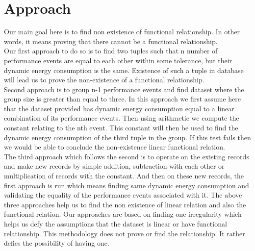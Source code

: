 \section{Approach}
Our main goal here is to find non existence of functional relationship. In other words, it means proving that there cannot be a functional relationship.\\
Our first approach to do so is to find two tuples such that n number of performance events are equal to each other within some tolerance, but their dynamic energy consumption is the same. Existence of such a tuple in database will lead us to prove the non-existence of a functional relationship.\\
Second approach is to group n-1 performance events and find dataset where the group size is greater than equal to three. In this approach we first assume here that the dataset provided has dynamic energy consumption equal to a linear combination of its performance events. Then using arithmetic we compute the constant relating to the nth event. This constant will then be used to find the dynamic energy consumption of the third tuple in the group. If this test fails then we would be able to conclude the non-existence linear functional relation.\\
The third approach which follows the second is to operate on the existing records and make new records by simple addition, subtraction with each other or multiplication of records with the constant. And then on these new records, the first approach is run which means finding same dynamic energy consumption and validating the equality of the performance events associated with it. The above three approaches help us to find the non existence of linear relation and also the functional relation. Our approaches are based on finding one irregularity which helps us defy the assumptions that the dataset is linear or have functional relationship. This methodology does not prove or find the relationship. It rather defies the possibility of having one.

